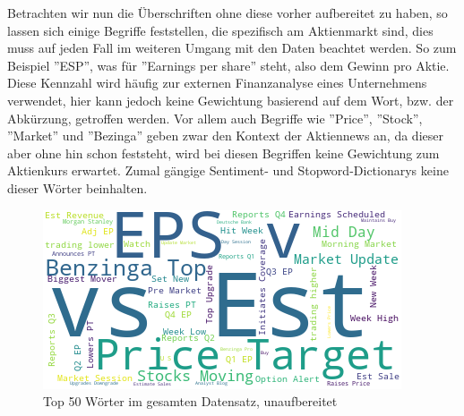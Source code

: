 Betrachten wir nun die Überschriften ohne diese vorher aufbereitet zu haben, so lassen sich einige Begriffe feststellen, die spezifisch am Aktienmarkt sind, dies muss auf jeden Fall im weiteren Umgang mit den Daten beachtet werden.
So zum Beispiel ''ESP'', was für ''Earnings per share'' steht, also dem Gewinn pro Aktie. Diese Kennzahl wird häufig zur externen Finanzanalyse eines Unternehmens verwendet, hier kann jedoch keine Gewichtung basierend auf dem Wort, bzw. der Abkürzung, getroffen werden. Vor allem auch Begriffe wie ''Price'', ''Stock'', ''Market'' und ''Bezinga'' geben zwar den Kontext der Aktiennews an, da dieser aber ohne hin schon feststeht, wird bei diesen Begriffen keine Gewichtung zum Aktienkurs erwartet. Zumal gängige Sentiment- und Stopword-Dictionarys keine dieser Wörter beinhalten. 
\begin{figure}
    \centering
    \includegraphics[scale=0.6]{img/wordcloud.png}
    \caption{Top 50 Wörter im gesamten Datensatz, unaufbereitet}
\end{figure}

